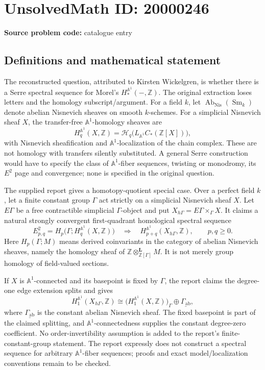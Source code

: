 \documentclass[11pt]{article}
\newcommand{\Z}{\mathbb{Z}}
\newcommand{\A}{\mathbb{A}}
\begin{document}
\section*{UnsolvedMath ID: 20000246}
\textbf{Source problem code:} catalogue entry
\subsection{Definitions and mathematical statement}
The reconstructed question, attributed to Kirsten Wickelgren, is whether there is a Serre spectral sequence for Morel's $H_*^{\A^1}(-,\Z)$. The original extraction loses letters and the homology subscript/argument. For a field $k$, let $\operatorname{Ab}_{\mathrm{Nis}}(\operatorname{Sm}_k)$ denote abelian Nisnevich sheaves on smooth $k$-schemes. For a simplicial Nisnevich sheaf $X$, the transfer-free $\A^1$-homology sheaves are
\[
 H_q^{\A^1}(X,\Z)=\mathcal H_q\bigl(L_{\A^1}C_*(\Z[X])\bigr),
\]
with Nisnevich sheafification and $\A^1$-localization of the chain complex. These are not homology with transfers silently substituted. A general Serre construction would have to specify the class of $\A^1$-fiber sequences, twisting or monodromy, its $E^2$ page and convergence; none is specified in the original question.

The supplied report gives a homotopy-quotient special case. Over a perfect field $k$, let a finite constant group $\Gamma$ act strictly on a simplicial Nisnevich sheaf $X$. Let $E\Gamma$ be a free contractible simplicial $\Gamma$-object and put $X_{h\Gamma}=E\Gamma\times_\Gamma X$. It claims a natural strongly convergent first-quadrant homological spectral sequence
\[
 E^2_{p,q}=H_p\bigl(\Gamma;H_q^{\A^1}(X,\Z)\bigr)
 \quad\Longrightarrow\quad H_{p+q}^{\A^1}(X_{h\Gamma},\Z),\qquad p,q\geq0.
\]
Here $H_p(\Gamma;M)$ means derived coinvariants in the category of abelian Nisnevich sheaves, namely the homology sheaf of $\Z\otimes^{\mathbf L}_{\Z[\Gamma]}M$. It is not merely group homology of field-valued sections.

If $X$ is $\A^1$-connected and its basepoint is fixed by $\Gamma$, the report claims the degree-one edge extension splits and gives
\[
 H_1^{\A^1}(X_{h\Gamma},\Z)\cong
 \bigl(H_1^{\A^1}(X,\Z)\bigr)_\Gamma\oplus
 \underline{\Gamma_{\mathrm{ab}}},
\]
where $\underline{\Gamma_{\mathrm{ab}}}$ is the constant abelian Nisnevich sheaf. The fixed basepoint is part of the claimed splitting, and $\A^1$-connectedness supplies the constant degree-zero coefficient. No order-invertibility assumption is added to the report's finite-constant-group statement. The report expressly does not construct a spectral sequence for arbitrary $\A^1$-fiber sequences; proofs and exact model/localization conventions remain to be checked.
\end{document}

